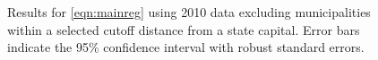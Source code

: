 \begin{figure}[h!]
	\begin{center}
	\end{center}
	\caption{Results for \protect\autoref{eqn:mainreg} using 2010 data excluding municipalities within a selected cutoff distance from a state capital. Error bars indicate the 95\% confidence interval with robust standard errors.}
	\label{fig:CapitalDistances}
\end{figure}	


